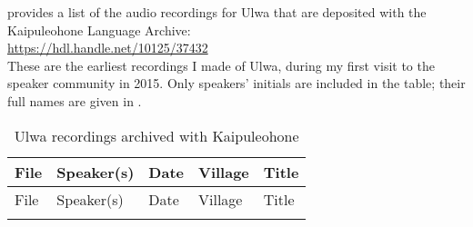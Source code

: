   provides a list of the audio recordings for Ulwa that are deposited with the Kaipuleohone Language Archive:\\

\url{https://hdl.handle.net/10125/37432}\\

These are the earliest recordings I made of Ulwa, during my first visit to the speaker community in 2015. Only speakers’ initials are included in the table; their full names are given in .



\begin{xltabular}{\textwidth}{llllQ}
\caption{\label{tab:K} Ulwa recordings archived with Kaipuleohone}\\
\lsptoprule
		File & Speaker(s) & Date & Village & Title\\
		\midrule\endfirsthead
    \midrule
    File & Speaker(s) & Date & Village & Title\\
		\midrule\endhead
    \midrule\endfoot
    \lspbottomrule
    \endlastfoot


\end{xltabular}
